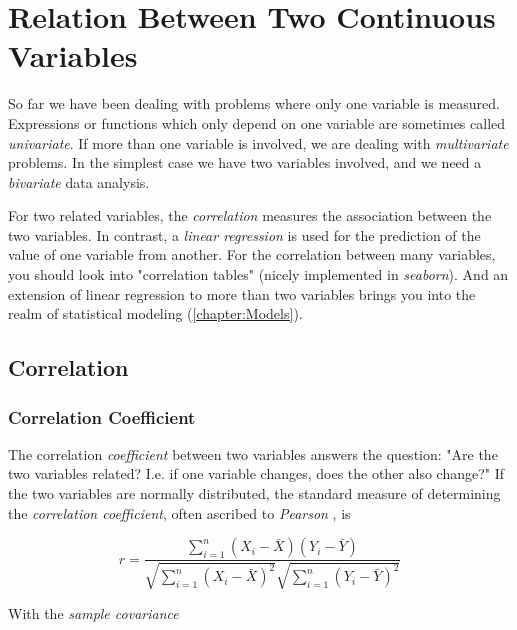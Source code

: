 \chapter{Relation Between Two Continuous Variables}

So far we have been dealing with problems where only one variable is measured. Expressions or functions which only depend on one variable are sometimes called \emph{univariate}. If more than one variable is involved, we are dealing with \emph{multivariate} problems. In the simplest case we have two variables involved, and we need a \emph{bivariate} data analysis.

For two related variables, the \emph{correlation} measures the association between the two variables. In contrast, a \emph{linear regression} is used for the prediction of the value of one variable from another. For the correlation between many variables, you should look into "correlation tables" (nicely implemented in \emph{seaborn}).  And an extension of linear regression to more than two variables brings you into the realm of statistical modeling (\ref{chapter:Models}).

\section{Correlation}

\subsection{Correlation Coefficient} 

The \gls{correlation} \emph{coefficient} between two variables answers the question: "Are the two variables related? I.e. if one variable changes, does the other also change?" If the two variables are normally distributed, the standard measure of determining the \emph{correlation coefficient}, often ascribed to \emph{Pearson} , is

\begin{equation}\label{eq:pearson}
  r = \frac{\sum\limits_{i=1}^n (X_i - \bar{X})(Y_i - \bar{Y})}{\sqrt{\sum\limits_{i=1}^n (X_i - \bar{X})^2} \sqrt{\sum\limits_{i=1}^n (Y_i - \bar{Y})^2}}
\end{equation}

With the \emph{sample covariance}

